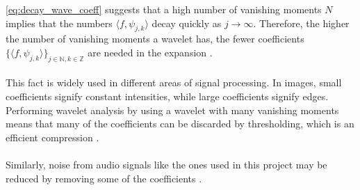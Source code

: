 \eqref{eq:decay_wave_coeff} suggests that a high number of vanishing moments $N$ implies that the numbers $\langle f, \psi_{j,k} \rangle$ decay quickly as $j \to \infty$. Therefore, the higher the number of vanishing moments a wavelet has, the fewer coefficients $\{ \langle f, \psi_{j,k} \rangle \}_{j\in\mathbb{N},k\in\mathbb{Z}}$ are needed in the expansion \cite{page 170, FSE2010}.
\\ \\
This fact is widely used in different areas of signal processing. In images, small coefficients signify constant intensities, while large coefficients signify edges. Performing wavelet analysis by using a wavelet with many vanishing moments means that many of the coefficients can be discarded by thresholding, which is an efficient compression \cite{page 174, FSE2010}.
\\ \\
Similarly, noise from audio signals like the ones used in this project may be reduced by removing some of the coefficients \cite{page 175, FSE2010}.